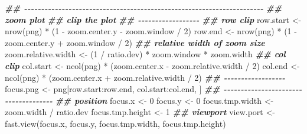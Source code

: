 \documentclass[
]{article}
\newenvironment{Shaded}{\begin{snugshade}}{\end{snugshade}}
\newcommand{\DecValTok}[1]{\textcolor[rgb]{0.00,0.00,0.81}{#1}}
\newcommand{\DocumentationTok}[1]{\textcolor[rgb]{0.56,0.35,0.01}{\textbf{\textit{#1}}}}
\newcommand{\FunctionTok}[1]{\textcolor[rgb]{0.00,0.00,0.00}{#1}}
\newcommand{\NormalTok}[1]{#1}
\newcommand{\OtherTok}[1]{\textcolor[rgb]{0.56,0.35,0.01}{#1}}
\newcommand{\SpecialCharTok}[1]{\textcolor[rgb]{0.00,0.00,0.00}{#1}}
\begin{document}
\begin{Shaded}
\begin{Highlighting}[]
    \DocumentationTok{\#\# {-}{-}{-}{-}{-}{-}{-}{-}{-}{-}{-}{-}{-}{-}{-}{-}{-}{-}{-}{-}{-}{-}{-}{-}{-}{-}{-}{-}{-}{-}{-}{-}{-}{-}{-}{-}{-}{-}{-}{-}{-}{-}{-}{-}{-}{-}{-}{-}{-}{-}{-}{-}{-}{-}{-}{-}{-}{-}{-}{-}{-}{-}{-}{-}{-}{-}{-}{-}{-}{-} }
    \DocumentationTok{\#\# zoom plot}
    \DocumentationTok{\#\# clip the plot}
    \DocumentationTok{\#\# {-}{-}{-}{-}{-}{-}{-}{-}{-}{-}{-}{-}{-}{-}{-}{-}{-}{-} }
    \DocumentationTok{\#\# row clip }
\NormalTok{    row.start }\OtherTok{\textless{}{-}} \FunctionTok{nrow}\NormalTok{(png) }\SpecialCharTok{*}\NormalTok{ (}\DecValTok{1} \SpecialCharTok{{-}}\NormalTok{ zoom.center.y }\SpecialCharTok{{-}}\NormalTok{ zoom.window }\SpecialCharTok{/} \DecValTok{2}\NormalTok{)}
\NormalTok{    row.end }\OtherTok{\textless{}{-}} \FunctionTok{nrow}\NormalTok{(png) }\SpecialCharTok{*}\NormalTok{ (}\DecValTok{1} \SpecialCharTok{{-}}\NormalTok{ zoom.center.y }\SpecialCharTok{+}\NormalTok{ zoom.window }\SpecialCharTok{/} \DecValTok{2}\NormalTok{)}
    \DocumentationTok{\#\# relative width of zoom size}
\NormalTok{    zoom.relative.width }\OtherTok{\textless{}{-}}\NormalTok{ (}\DecValTok{1} \SpecialCharTok{/}\NormalTok{ ratio.dev) }\SpecialCharTok{*}\NormalTok{ zoom.window }\SpecialCharTok{*}\NormalTok{ zoom.width}
    \DocumentationTok{\#\# col clip}
\NormalTok{    col.start }\OtherTok{\textless{}{-}} \FunctionTok{ncol}\NormalTok{(png) }\SpecialCharTok{*}\NormalTok{ (zoom.center.x }\SpecialCharTok{{-}}\NormalTok{ zoom.relative.width }\SpecialCharTok{/} \DecValTok{2}\NormalTok{)}
\NormalTok{    col.end }\OtherTok{\textless{}{-}} \FunctionTok{ncol}\NormalTok{(png) }\SpecialCharTok{*}\NormalTok{ (zoom.center.x }\SpecialCharTok{+}\NormalTok{ zoom.relative.width }\SpecialCharTok{/} \DecValTok{2}\NormalTok{)}
    \DocumentationTok{\#\# {-}{-}{-}{-}{-}{-}{-}{-}{-}{-}{-}{-}{-}{-}{-}{-}{-}{-} }
\NormalTok{    focus.png }\OtherTok{\textless{}{-}}\NormalTok{ png[row.start}\SpecialCharTok{:}\NormalTok{row.end, col.start}\SpecialCharTok{:}\NormalTok{col.end, ]}
    \DocumentationTok{\#\# {-}{-}{-}{-}{-}{-}{-}{-}{-}{-}{-}{-}{-}{-}{-}{-}{-}{-}{-}{-}{-}{-}{-}{-}{-}{-}{-}{-}{-}{-}{-}{-}{-}{-}{-}{-}{-} }
    \DocumentationTok{\#\# position}
\NormalTok{    focus.x }\OtherTok{\textless{}{-}} \DecValTok{0}
\NormalTok{    focus.y }\OtherTok{\textless{}{-}} \DecValTok{0}
\NormalTok{    focus.tmp.width }\OtherTok{\textless{}{-}}\NormalTok{ zoom.width }\SpecialCharTok{/}\NormalTok{ ratio.dev}
\NormalTok{    focus.tmp.height }\OtherTok{\textless{}{-}} \DecValTok{1}
    \DocumentationTok{\#\# viewport}
\NormalTok{    view.port }\OtherTok{\textless{}{-}} \FunctionTok{fast.view}\NormalTok{(focus.x, focus.y, focus.tmp.width, focus.tmp.height)}

\end{Highlighting}
\end{Shaded}
\end{document}
